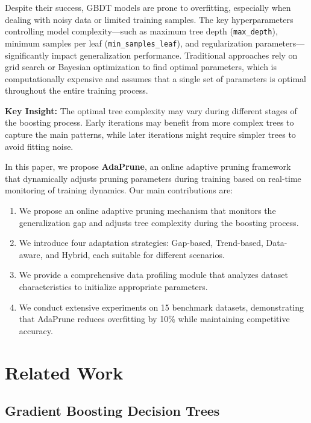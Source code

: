 \documentclass[conference]{IEEEtran}
\begin{document}
Despite their success, GBDT models are prone to overfitting, especially when dealing with noisy data or limited training samples. The key hyperparameters controlling model complexity—such as maximum tree depth (\texttt{max\_depth}), minimum samples per leaf (\texttt{min\_samples\_leaf}), and regularization parameters—significantly impact generalization performance.  Traditional approaches rely on grid search or Bayesian optimization to find optimal parameters, which is computationally expensive and assumes that a single set of parameters is optimal throughout the entire training process.

\textbf{Key Insight:} The optimal tree complexity may vary during different stages of the boosting process.  Early iterations may benefit from more complex trees to capture the main patterns, while later iterations might require simpler trees to avoid fitting noise. 

In this paper, we propose \textbf{AdaPrune}, an online adaptive pruning framework that dynamically adjusts pruning parameters during training based on real-time monitoring of training dynamics. Our main contributions are:

\begin{enumerate}
    \item We propose an online adaptive pruning mechanism that monitors the generalization gap and adjusts tree complexity during the boosting process. 
    \item We introduce four adaptation strategies: Gap-based, Trend-based, Data-aware, and Hybrid, each suitable for different scenarios. 
    \item We provide a comprehensive data profiling module that analyzes dataset characteristics to initialize appropriate parameters.
    \item We conduct extensive experiments on 15 benchmark datasets, demonstrating that AdaPrune reduces overfitting by 10\% while maintaining competitive accuracy.
\end{enumerate}

\section{Related Work}

\subsection{Gradient Boosting Decision Trees}
\end{document}
